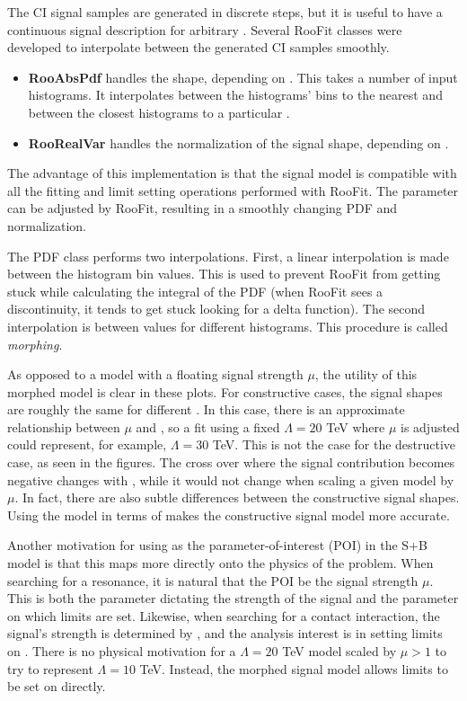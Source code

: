 The CI signal samples are generated in discrete steps, but it is useful to have a continuous signal description for arbitrary \lam.
Several RooFit classes were developed to interpolate between the generated CI samples smoothly.
\begin{itemize}
    \item \textbf{RooAbsPdf} handles the shape, depending on \lam. This takes a number of input histograms. It interpolates between the histograms' bins to the nearest \mll and between the closest histograms to a particular \lam.
    \item \textbf{RooRealVar} handles the normalization of the signal shape, depending on \lam.
\end{itemize}
The advantage of this implementation is that the signal model is compatible with all the fitting and limit setting operations performed with RooFit.
The \lam parameter can be adjusted by RooFit, resulting in a smoothly changing PDF and normalization.

The PDF class performs two interpolations.
First, a linear interpolation is made between the histogram bin values.
This is used to prevent RooFit from getting stuck while calculating the integral of the PDF (when RooFit sees a discontinuity, it tends to get stuck looking for a delta function).
The second interpolation is between \lam values for different histograms.
This procedure is called \emph{morphing}.

As opposed to a model with a floating signal strength $\mu$, the utility of this morphed model is clear in these plots.
For constructive cases, the signal shapes are roughly the same for different \lam.
In this case, there is an approximate relationship between $\mu$ and \lam, so a fit using a fixed $\Lambda=20$ TeV where $\mu$ is adjusted could represent, for example, $\Lambda=30$ TeV.
This is not the case for the destructive case, as seen in the figures.
The cross over where the signal contribution becomes negative changes with \lam, while it would not change when scaling a given model by $\mu$.
In fact, there are also subtle differences between the constructive signal shapes.
Using the model in terms of \lam makes the constructive signal model more accurate.

Another motivation for using \lam as the parameter-of-interest (POI) in the S+B model is that this maps more directly onto the physics of the problem.
When searching for a resonance, it is natural that the POI be the signal strength $\mu$.
This is both the parameter dictating the strength of the signal and the  parameter on which limits are set.
Likewise, when searching for a contact interaction, the signal's strength is determined by \lam, and the analysis interest is in setting limits on \lam.
There is no physical motivation for a $\Lambda=20$ TeV model scaled by $\mu>1$ to try to represent $\Lambda=10$ TeV. Instead, the morphed signal model allows limits to be set on \lam directly.

